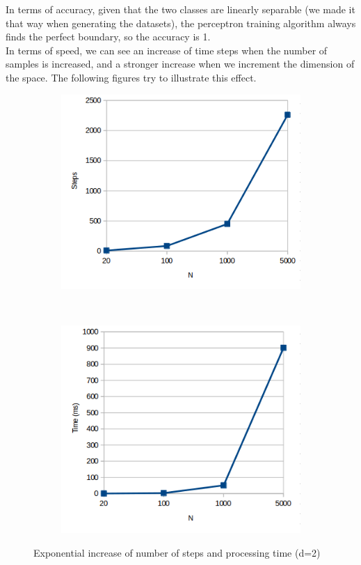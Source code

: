 \documentclass{article}
\begin{document}
\begin{enumerate}[label=(\alph*)]
In terms of accuracy, given that the two classes are linearly separable (we made it that way when generating the datasets), the perceptron training algorithm always finds the perfect boundary, so the accuracy is 1.\\
In terms of speed, we can see an increase of time steps when the number of samples is increased, and a stronger increase when we increment the dimension of the space. The following figures try to illustrate this effect.

\begin{figure}[H]
    \centering
    \begin{subfigure}[t]{0.5\textwidth}
        \centering
		\includegraphics[scale=0.5]{images/6_a.png} 
    \end{subfigure}%
    ~ 
    \begin{subfigure}[t]{0.5\textwidth}
        \centering
		\includegraphics[scale=0.5]{images/6_b.png} 
    \end{subfigure}
    \caption{Exponential increase of number of steps and processing time (d=2)}
\end{figure}


\end{enumerate}
\end{document}
